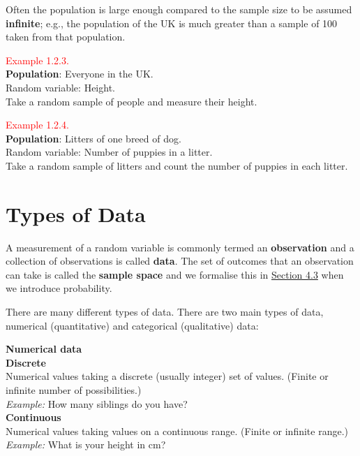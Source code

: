 \documentclass[
]{book}
\begin{document}
Often the population is large enough compared to the sample size to be
assumed \textbf{infinite}; e.g., the population of the UK is much greater than
a sample of 100 taken from that population.

\leavevmode{}%
\textcolor{red}{Example 1.2.3.}\\
\textbf{Population}: Everyone in the UK.\\
Random variable: Height.\\
Take a random sample of people and measure their height.

\hfill\break

\leavevmode{}%
\textcolor{red}{Example 1.2.4.}\\
\textbf{Population}: Litters of one breed of dog.\\
Random variable: Number of puppies in a litter.\\
Take a random sample of litters and count the number of puppies in each
litter.

\hypertarget{intro_data}{%
\section{Types of Data}\label{intro_data}}

A measurement of a random variable is commonly termed an \textbf{observation} and a
collection of observations is called \textbf{data}. The set of outcomes that
an observation can take is called the \textbf{sample space} and we formalise this in \protect\hyperlink{prob:sample_space}{Section 4.3} when we introduce probability.

There are many different types of data. There are two main types of data, numerical (quantitative) and categorical (qualitative) data:

\leavevmode{}%
{\textbf{Numerical data}}\\
\textbf{Discrete}\\
Numerical values taking a discrete (usually integer) set of values. (Finite or infinite number of possibilities.)\\
\emph{Example:} How many siblings do you have?\\
\textbf{Continuous}\\
Numerical values taking values on a continuous range. (Finite or infinite range.)\\
\emph{Example:} What is your height in cm?
\end{document}
